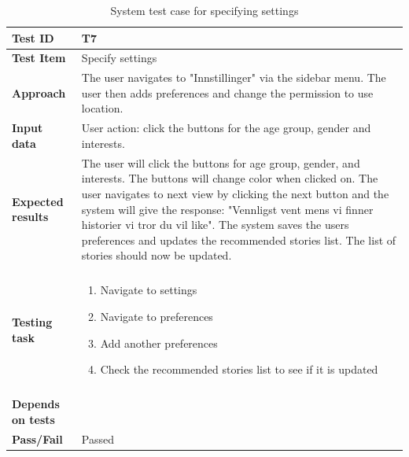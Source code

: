 \begin{appendices}
	\begin{table}[H]
		\small
		\centering
		\caption{System test case for specifying settings}
		\begin{tabular}{ | l | l  |}
			\hline
			\textbf{Test ID} & T7  \\ \hline
			\textbf{Test Item} & Specify settings \\ \hline
			\textbf{Approach} & \begin{minipage}{5in}The user navigates to "Innstillinger" via the sidebar menu. The user then adds preferences and change the permission to use location. \end{minipage}\\ \hline		
			\textbf{Input data} &  \begin{minipage}{5in}User action: click the buttons for the age group, gender and interests. \end{minipage}\\ \hline
			\textbf{Expected results} &  \begin{minipage}{5in}The user will click the buttons for age group, gender, and interests. The buttons will change color when clicked on. The user navigates to next view by clicking the next button and the system will give the response: "Vennligst vent mens vi finner historier vi tror du vil like". 
			The system saves the users preferences and updates the recommended stories list. The list of stories should now be updated.  \end{minipage}\\ \hline&\\[-3.8ex]
			\textbf{Testing task} & \begin{minipage}{5in}
			\begin{enumerate}[noitemsep]
				\item Navigate to settings
				\item Navigate to preferences
				\item Add another preferences
				\item Check the recommended stories list to see if it is updated

			\end{enumerate}\end{minipage}
			\\ &\\[-3.8ex]\hline
			\textbf{Depends on tests} & \\ \hline		
			\textbf{Pass/Fail} & Passed \\\hline			
		\end{tabular}
	\label{Tab:systemTesting7}
	\end{table}
	

\end{appendices}
